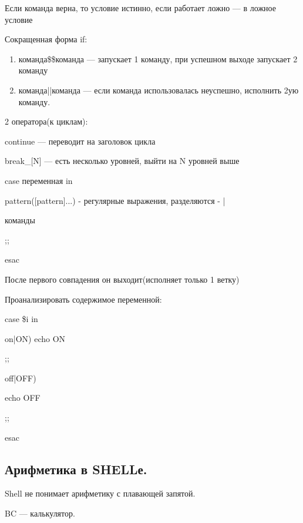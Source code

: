 \par 
Если команда верна, то условие истинно,
если работает ложно — в ложное условие
\par 
Сокращенная форма if:
\begin{enumerate}
	\item \par 
	команда\$\$команда — запускает 1 команду,
	при успешном выходе запускает 2 команду
	\item \par 
	команда||команда — если команда
	использовалась неуспешно, исполнить
	2ую команду.
\end{enumerate}
\par 
2 оператора(к циклам):
\par 
continue — переводит на заголовок цикла
\par 
break\_[N] — есть несколько уровней, выйти
на N уровней выше
\par 
case переменная in
\par 
pattern([pattern]...) - регулярные выражения,
разделяются - |
\par 
команды
\par 
;;
\par 
esac
\par 
После первого совпадения он выходит(исполняет
только 1 ветку)
\par 
Проанализировать содержимое переменной:
\par 
case \$i in
\par 
on|ON) echo ON
\par 
;;
\par 
off|OFF)
\par 
echo OFF
\par 
;;
\par 
esac

\subsection { Арифметика в SHELLе.}
\begin{alltt}

\end{alltt}
\par 
Shell не понимает арифметику с плавающей
запятой.
\par 
BC — калькулятор.

